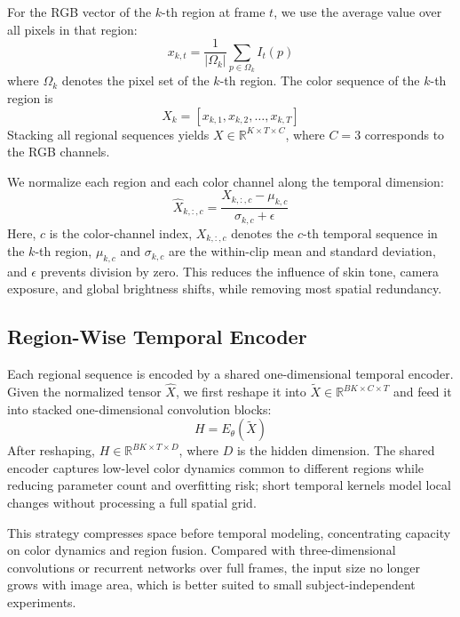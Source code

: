 \documentclass[runningheads]{llncs}
\begin{document}
For the RGB vector of the $k$-th region at frame $t$, we use the average value over all pixels in that region:
\begin{equation}
    x_{k,t} = \frac{1}{|\Omega_k|} \sum_{p \in \Omega_k} I_t(p)
\end{equation}
where $\Omega_k$ denotes the pixel set of the $k$-th region. The color sequence of the $k$-th region is
\begin{equation}
    X_k = [x_{k,1}, x_{k,2}, \ldots, x_{k,T}]
\end{equation}
Stacking all regional sequences yields $X \in \mathbb{R}^{K \times T \times C}$, where $C=3$ corresponds to the RGB channels.

We normalize each region and each color channel along the temporal dimension:
\begin{equation}
    \hat{X}_{k,:,c} = \frac{X_{k,:,c} - \mu_{k,c}}{\sigma_{k,c}+\epsilon}
\end{equation}
Here, $c$ is the color-channel index, $X_{k,:,c}$ denotes the $c$-th temporal sequence in the $k$-th region, $\mu_{k,c}$ and $\sigma_{k,c}$ are the within-clip mean and standard deviation, and $\epsilon$ prevents division by zero. This reduces the influence of skin tone, camera exposure, and global brightness shifts, while removing most spatial redundancy.

\subsection{Region-Wise Temporal Encoder}

Each regional sequence is encoded by a shared one-dimensional temporal encoder. Given the normalized tensor $\hat{X}$, we first reshape it into $\tilde{X} \in \mathbb{R}^{B K \times C \times T}$ and feed it into stacked one-dimensional convolution blocks:
\begin{equation}
    H = E_{\theta}(\tilde{X})
\end{equation}
After reshaping, $H \in \mathbb{R}^{B K \times T \times D}$, where $D$ is the hidden dimension. The shared encoder captures low-level color dynamics common to different regions while reducing parameter count and overfitting risk; short temporal kernels model local changes without processing a full spatial grid.

This strategy compresses space before temporal modeling, concentrating capacity on color dynamics and region fusion. Compared with three-dimensional convolutions or recurrent networks over full frames, the input size no longer grows with image area, which is better suited to small subject-independent experiments.
\end{document}
